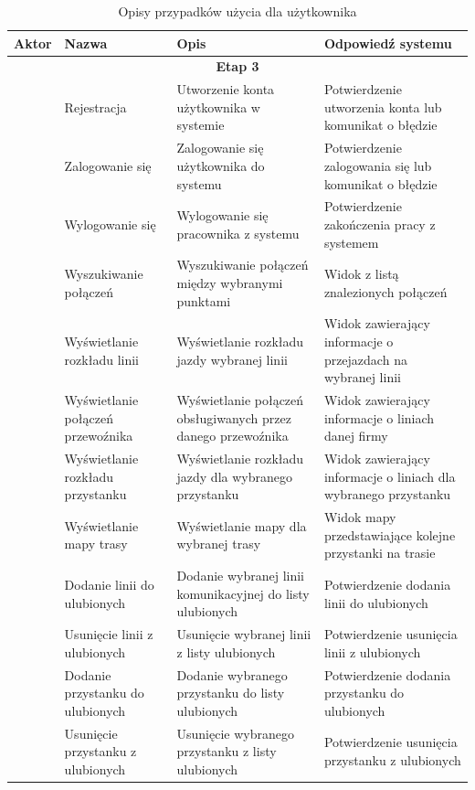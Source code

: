 \documentclass[10pt,a4paper]{article}
\begin{document}
\begin{table}[H]
	\begin{tabularx}{\textwidth}{|c|X|X|X|}
		\hline
		\textbf{Aktor} & \textbf{Nazwa} & \textbf{Opis} & \textbf{Odpowiedź systemu} \\
		\hline
		\multicolumn{4}{|c|}{\textbf{Etap 3}} \\
		\hline
		\multirow{30}{*}{\rotatebox[origin=c]{90}{Użytkownik}}
		& Rejestracja
		& Utworzenie konta użytkownika w systemie
		& Potwierdzenie utworzenia konta lub komunikat o błędzie \\
		\cline{2-4}
		& Zalogowanie się 
		& Zalogowanie się użytkownika do systemu
		& Potwierdzenie zalogowania się lub komunikat o błędzie \\
		\cline{2-4}
		& Wylogowanie się
		& Wylogowanie się pracownika z systemu
		& Potwierdzenie zakończenia pracy z systemem \\
		\cline{2-4}
		& Wyszukiwanie połączeń
		& Wyszukiwanie połączeń między wybranymi punktami
		& Widok z listą znalezionych połączeń \\
		\cline{2-4}
		& Wyświetlanie rozkładu linii
		& Wyświetlanie rozkładu jazdy wybranej linii
		& Widok zawierający informacje o przejazdach na wybranej linii \\
		\cline{2-4}
		& Wyświetlanie połączeń przewoźnika
		& Wyświetlanie połączeń obsługiwanych przez danego przewoźnika
		& Widok zawierający informacje o liniach danej firmy \\
		\cline{2-4}
		& Wyświetlanie rozkładu przystanku
		& Wyświetlanie rozkładu jazdy dla wybranego przystanku
		& Widok zawierający informacje o liniach dla wybranego przystanku \\
		\cline{2-4}
		& Wyświetlanie mapy trasy
		& Wyświetlanie mapy dla wybranej trasy
		& Widok mapy przedstawiające kolejne przystanki na trasie \\
		\cline{2-4}
		& Dodanie linii do ulubionych
		& Dodanie wybranej linii komunikacyjnej do listy ulubionych
		& Potwierdzenie dodania linii do ulubionych \\
		\cline{2-4}
		& Usunięcie linii z ulubionych
		& Usunięcie wybranej linii z listy ulubionych
		& Potwierdzenie usunięcia linii z ulubionych \\
		\cline{2-4}
		& Dodanie przystanku do ulubionych
		& Dodanie wybranego przystanku do listy ulubionych
		& Potwierdzenie dodania przystanku do ulubionych \\
		\cline{2-4}
		& Usunięcie przystanku z ulubionych
		& Usunięcie wybranego przystanku z listy ulubionych
		& Potwierdzenie usunięcia przystanku z ulubionych \\
		\hline
	\end{tabularx}
	\caption{Opisy przypadków użycia dla użytkownika}
\end{table}
\end{document}
